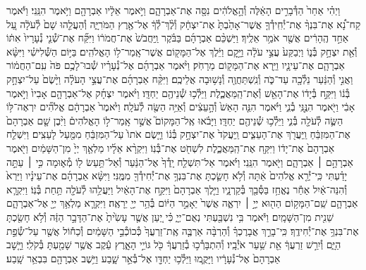 \documentclass[twoside, openany, parskip=half, 11pt]{book}
\begin{document}
וַיְהִ֗י אַחַר֙ הַדְּ֯בָרִ֣ים הָאֵ֔לֶּה  וְ֯הָ֣אֱלֹהִ֔ים נִסָּ֖ה אֶת־אַבְרָהָ֑ם וַיֹּ֣אמֶר אֵלָ֔יו אַבְרָהָ֖ם וַיֹּ֥אמֶר הִנֵּֽנִי׃ וַיֹּ֡אמֶר קַח־נָ֠א אֶת־בִּנְךָ֨ אֶת־יְ֯חִֽידְ֯ךָ֤ אֲשֶׁר־אָהַ֙בְתָּ֙ אֶת־יִצְחָ֔ק וְ֯לֶ֨ךְ־לְ֯ךָ֔ אֶל־אֶ֖רֶץ הַמֹּרִיָּ֑ה וְ֯הַעֲלֵ֤הוּ שָׁם֙ לְ֯עֹלָ֔ה עַ֚ל אַחַ֣ד הֶֽהָרִ֔ים אֲשֶׁ֖ר אֹמַ֥ר אֵלֶֽיךָ׃ וַיַּשְׁכֵּ֨ם אַבְרָהָ֜ם בַּבֹּ֗קֶר וַֽיַּחֲבֹשׁ֙ אֶת־חֲמֹר֔וֹ וַיִּקַּ֞ח אֶת־שְׁ֯נֵ֤י נְ֯עָרָיו֙ אִתּ֔וֹ וְ֯אֵ֖ת יִצְחָ֣ק בְּ֯נ֑וֹ וַיְבַקַּע֙ עֲצֵ֣י עֹלָ֔ה וַיָּ֣קׇם וַיֵּ֔לֶךְ אֶל־הַמָּק֖וֹם אֲשֶׁר־אָֽמַר־ל֥וֹ הָאֱלֹהִֽים׃ בַּיּ֣וֹם הַשְּׁ֯לִישִׁ֗י וַיִּשָּׂ֨א אַבְרָהָ֧ם אֶת־עֵינָ֛יו וַיַּ֥רְא אֶת־הַמָּק֖וֹם מֵרָחֹֽק׃ וַיֹּ֨אמֶר אַבְרָהָ֜ם אֶל־נְ֯עָרָ֗יו שְׁ֯בוּ־לָכֶ֥ם פֹּה֙ עִֽם־הַחֲמ֔וֹר וַאֲנִ֣י וְ֯הַנַּ֔עַר נֵלְ֯כָ֖ה עַד־כֹּ֑ה וְ֯נִֽשְׁתַּחֲוֶ֖ה וְ֯נָשׁ֥וּבָה אֲלֵיכֶֽם׃ וַיִּקַּ֨ח אַבְרָהָ֜ם אֶת־עֲצֵ֣י הָעֹלָ֗ה וַיָּ֙שֶׂם֙ עַל־יִצְחָ֣ק בְּ֯נ֔וֹ וַיִּקַּ֣ח בְּ֯יָד֔וֹ אֶת־הָאֵ֖שׁ וְ֯אֶת־הַֽמַּאֲכֶ֑לֶת וַיֵּלְ֯כ֥וּ שְׁ֯נֵיהֶ֖ם יַחְדָּֽו׃ וַיֹּ֨אמֶר יִצְחָ֜ק אֶל־אַבְרָהָ֤ם אָבִיו֙ וַיֹּ֣אמֶר אָבִ֔י וַיֹּ֖אמֶר הִנֶּ֣נִּֽי בְ֯נִ֑י וַיֹּ֗אמֶר הִנֵּ֤ה הָאֵשׁ֙ וְ֯הָ֣עֵצִ֔ים וְ֯אַיֵּ֥ה הַשֶּׂ֖ה לְ֯עֹלָֽה׃ וַיֹּ֙אמֶר֙ אַבְרָהָ֔ם אֱלֹהִ֞ים יִרְאֶה־לּ֥וֹ הַשֶּׂ֛ה לְ֯עֹלָ֖ה בְּ֯נִ֑י וַיֵּלְ֯כ֥וּ שְׁ֯נֵיהֶ֖ם יַחְדָּֽו׃ וַיָּבֹ֗אוּ אֶֽל־הַמָּקוֹם֮ אֲשֶׁ֣ר אָֽמַר־ל֣וֹ הָאֱלֹהִים֒ וַיִּ֨בֶן שָׁ֤ם אַבְרָהָם֙ אֶת־הַמִּזְבֵּ֔חַ וַֽיַּעֲרֹ֖ךְ אֶת־הָעֵצִ֑ים וַֽיַּעֲקֹד֙ אֶת־יִצְחָ֣ק בְּ֯נ֔וֹ וַיָּ֤שֶׂם אֹתוֹ֙ עַל־הַמִּזְבֵּ֔חַ מִמַּ֖עַל לָעֵצִֽים׃ וַיִּשְׁלַ֤ח אַבְרָהָם֙ אֶת־יָד֔וֹ וַיִּקַּ֖ח אֶת־הַֽמַּאֲכֶ֑לֶת לִשְׁחֹ֖ט אֶת־בְּ֯נֽוֹ׃ וַיִּקְרָ֨א אֵלָ֜יו מַלְאַ֤ךְ יְיָ֙ מִן־הַשָּׁמַ֔יִם וַיֹּ֖אמֶר אַבְרָהָ֣ם ׀ אַבְרָהָ֑ם וַיֹּ֖אמֶר הִנֵּֽנִי׃ וַיֹּ֗אמֶר אַל־תִּשְׁלַ֤ח יָֽדְ֯ךָ֙ אֶל־הַנַּ֔עַר וְ֯אַל־תַּ֥עַשׂ ל֖וֹ מְ֯א֑וּמָה כִּ֣י ׀ עַתָּ֣ה יָדַ֗עְתִּי כִּֽי־יְ֯רֵ֤א אֱלֹהִים֙ אַ֔תָּה וְ֯לֹ֥א חָשַׂ֛כְתָּ אֶת־בִּנְךָ֥ אֶת־יְ֯חִידְ֯ךָ֖ מִמֶּֽנִּי׃ וַיִּשָּׂ֨א אַבְרָהָ֜ם אֶת־עֵינָ֗יו וַיַּרְא֙ וְ֯הִנֵּה־אַ֔יִל אַחַ֕ר נֶאֱחַ֥ז בַּסְּ֯בַ֖ךְ בְּ֯קַרְנָ֑יו וַיֵּ֤לֶךְ אַבְרָהָם֙ וַיִּקַּ֣ח אֶת־הָאַ֔יִל וַיַּעֲלֵ֥הוּ לְ֯עֹלָ֖ה תַּ֥חַת בְּ֯נֽוֹ׃ וַיִּקְרָ֧א אַבְרָהָ֛ם שֵֽׁם־הַמָּק֥וֹם הַה֖וּא יְיָ֣ ׀ יִרְאֶ֑ה אֲשֶׁר֙ יֵאָמֵ֣ר הַיּ֔וֹם בְּ֯הַ֥ר יְיָ֖ יֵרָאֶֽה׃ וַיִּקְרָ֛א מַלְאַ֥ךְ יְיָ֖ אֶל־אַבְרָהָ֑ם שֵׁנִ֖ית מִן־הַשָּׁמָֽיִם׃ וַיֹּ֕אמֶר בִּ֥י נִשְׁבַּ֖עְתִּי נְאֻם־יְיָ֑ כִּ֗י יַ֚עַן אֲשֶׁ֤ר עָשִׂ֙יתָ֙ אֶת־הַדָּבָ֣ר הַזֶּ֔ה וְ֯לֹ֥א חָשַׂ֖כְתָּ אֶת־בִּנְךָ֥ אֶת־יְ֯חִידֶֽךָ׃ כִּֽי־בָרֵ֣ךְ אֲבָרֶכְךָ֗ וְ֯הַרְבָּ֨ה אַרְבֶּ֤ה אֶֽת־זַרְעֲךָ֙ כְּ֯כוֹכְ֯בֵ֣י הַשָּׁמַ֔יִם וְ֯כַח֕וֹל אֲשֶׁ֖ר עַל־שְׂ֯פַ֣ת הַיָּ֑ם וְ֯יִרַ֣שׁ זַרְעֲךָ֔ אֵ֖ת שַׁ֥עַר אֹיְ֯בָֽיו׃ וְ֯הִתְבָּרְ֯כ֣וּ בְ֯זַרְעֲךָ֔ כֹּ֖ל גּוֹיֵ֣י הָאָ֑רֶץ עֵ֕קֶב אֲשֶׁ֥ר שָׁמַ֖עְתָּ בְּ֯קֹלִֽי׃ וַיָּ֤שׇׁב אַבְרָהָם֙ אֶל־נְ֯עָרָ֔יו וַיָּקֻ֛מוּ וַיֵּלְ֯כ֥וּ יַחְדָּ֖ו אֶל־בְּ֯אֵ֣ר שָׁ֑בַע וַיֵּ֥שֶׁב אַבְרָהָ֖ם בִּבְאֵ֥ר שָֽׁבַע׃
\end{document}

